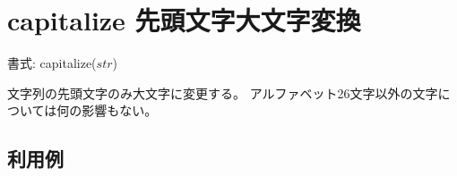 
%

\section{capitalize 先頭文字大文字変換\label{sect:capitalize}}

書式: capitalize($str$)

文字列の先頭文字のみ大文字に変更する。 
アルファベット26文字以外の文字については何の影響もない。

\subsection*{利用例}


%

